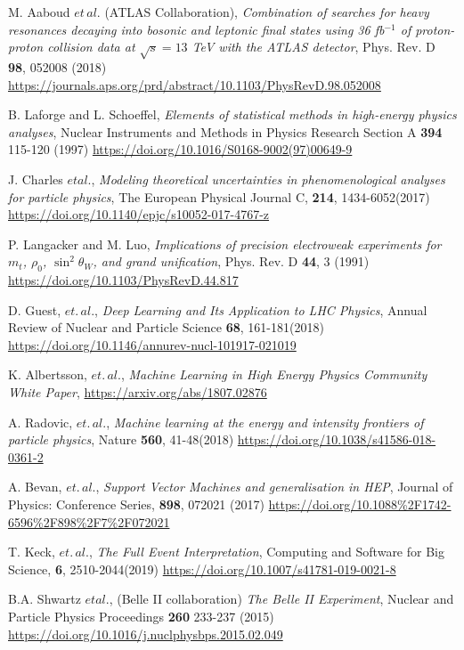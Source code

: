 \documentclass{article}
\begin{document}
\begin{thebibliography}{9}
M. Aaboud $et\,al.$ (ATLAS Collaboration),
\textit{Combination of searches for heavy resonances decaying into bosonic and leptonic final states using 36 fb$^{-1}$ of proton-proton collision data at $\sqrt{s}=13$ TeV with the ATLAS detector},
Phys. Rev. D \textbf{98}, 052008 (2018)
\url{https://journals.aps.org/prd/abstract/10.1103/PhysRevD.98.052008}

B. Laforge and L. Schoeffel,
\textit{Elements of statistical methods in high-energy physics analyses},
Nuclear Instruments and Methods in Physics Research Section A \textbf{394} 115-120 (1997)
\url{https://doi.org/10.1016/S0168-9002(97)00649-9}

J. Charles $et al.$,
\textit{Modeling theoretical uncertainties in phenomenological analyses for particle physics},
The European Physical Journal C, \textbf{214}, 1434-6052(2017)
\url{https://doi.org/10.1140/epjc/s10052-017-4767-z}

P. Langacker and M. Luo,
\textit{Implications of precision electroweak experiments for $m_{t}$, $\rho_0$, $\sin^2\theta_W$, and grand unification},
Phys. Rev. D \textbf{44}, 3 (1991)
\url{https://doi.org/10.1103/PhysRevD.44.817}


D. Guest, $et.\,al.$,
\textit{Deep Learning and Its Application to LHC Physics},
Annual Review of Nuclear and Particle Science  \textbf{68}, 161-181(2018)
\url{https://doi.org/10.1146/annurev-nucl-101917-021019}

K. Albertsson, $et.\,al.$,
\textit{Machine Learning in High Energy Physics Community White Paper},
\url{https://arxiv.org/abs/1807.02876}


A. Radovic, $et.\,al.$,
\textit{Machine learning at the energy and intensity frontiers of particle physics},
Nature \textbf{560}, 41-48(2018)
\url{https://doi.org/10.1038/s41586-018-0361-2}

A. Bevan,  $et.\,al.$,
\textit{Support Vector Machines and generalisation in HEP},
Journal of Physics: Conference Series, \textbf{898}, 072021 (2017)
\url{https://doi.org/10.1088\%2F1742-6596\%2F898\%2F7\%2F072021}


T. Keck,  $et.\,al.$,
\textit{The Full Event Interpretation},
Computing and Software for Big Science, \textbf{6}, 2510-2044(2019)
\url{https://doi.org/10.1007/s41781-019-0021-8}


B.A. Shwartz $et al.$, (Belle II collaboration)
\textit{The Belle II Experiment},
Nuclear and Particle Physics Proceedings \textbf{260} 233-237 (2015)
\url{https://doi.org/10.1016/j.nuclphysbps.2015.02.049}



\end{thebibliography}
\end{document}
